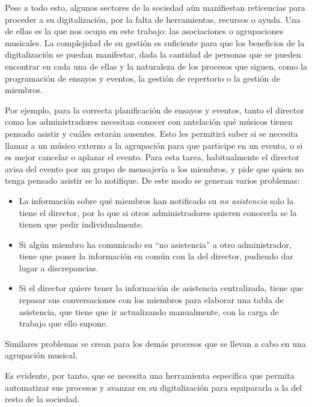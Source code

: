 
Pese a todo esto, algunos sectores de la sociedad aún manifiestan reticencias para proceder a su digitalización, por la falta de herramientas, recursos o ayuda. 
Una de ellas es la que nos ocupa en este trabajo: las asociaciones o agrupaciones musicales. La complejidad de su gestión es suficiente para que los beneficios de la digitalización se puedan manifestar, dada la cantidad de personas que se pueden encontrar en cada una de ellas y la naturaleza de los procesos que siguen, como la programación de ensayos y eventos, la gestión de repertorio o la gestión de miembros.

Por ejemplo, para la correcta planificación de ensayos y eventos, tanto el director como los administradores necesitan conocer con antelación qué músicos tienen pensado asistir y cuáles estarán ausentes. Esto les permitirá saber si se necesita llamar a un músico externo a la agrupación para que participe en un evento, o si es mejor cancelar o aplazar el evento. Para esta tarea, habitualmente el director avisa del evento por un grupo de mensajería a los miembros, y pide que quien no tenga pensado asistir se lo notifique. De este modo se generan varios problemas:

\begin{itemize}
    \item La información sobre qué miembros han notificado su \textit{no asistencia} solo la tiene el director, por lo que si otros administradores quieren conocerla se la tienen que pedir individualmente.
    \item Si algún miembro ha comunicado su ``no asistencia'' a otro administrador, tiene que poner la información en común con la del director, pudiendo dar lugar a discrepancias.
    \item Si el director quiere tener la información de asistencia centralizada, tiene que repasar sus conversaciones con los miembros para elaborar una tabla de asistencia, que tiene que ir actualizando manualmente, con la carga de trabajo que ello supone.
\end{itemize}

Similares problemas se crean para los demás procesos que se llevan a cabo en una agrupación musical.

Es evidente, por tanto, que se necesita una herramienta específica que permita automatizar sus procesos y avanzar en su digitalización para equipararla a la del resto de la sociedad.

